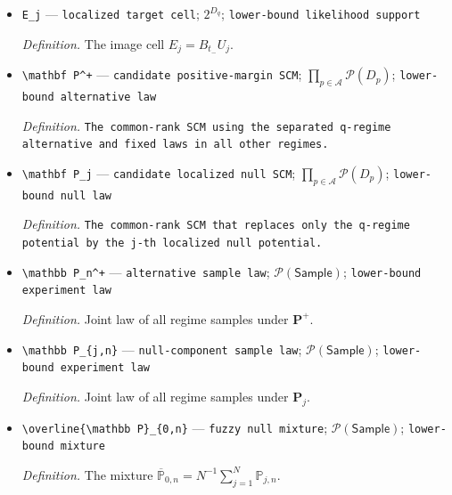 \documentclass{article}
\begin{document}
\begin{itemize}
  \par\smallskip\noindent\emph{Definition.} The density difference \(e_j=f_q^{(j)}-f_q^+\).
  \item \texttt{E\_\allowbreak{}j} --- \texttt{localized target cell}; \(2^{D_q}\); \texttt{lower-\allowbreak{}bound likelihood support}
  \par\smallskip\noindent\emph{Definition.} The image cell \(E_j=B_{t_{-}}U_j\).
  \item \texttt{\textbackslash{}\allowbreak{}mathbf P\textasciicircum{}+\allowbreak{}} --- \texttt{candidate positive-\allowbreak{}margin SCM}; \(\prod_{p\in\mathcal A}\mathcal P(D_p)\); \texttt{lower-\allowbreak{}bound alternative law}
  \par\smallskip\noindent\emph{Definition.} \texttt{The common-\allowbreak{}rank SCM using the separated q-\allowbreak{}regime alternative and fixed laws in all other regimes.}
  \item \texttt{\textbackslash{}\allowbreak{}mathbf P\_\allowbreak{}j} --- \texttt{candidate localized null SCM}; \(\prod_{p\in\mathcal A}\mathcal P(D_p)\); \texttt{lower-\allowbreak{}bound null law}
  \par\smallskip\noindent\emph{Definition.} \texttt{The common-\allowbreak{}rank SCM that replaces only the q-\allowbreak{}regime potential by the j-\allowbreak{}th localized null potential.}
  \item \texttt{\textbackslash{}\allowbreak{}mathbb P\_\allowbreak{}n\textasciicircum{}+\allowbreak{}} --- \texttt{alternative sample law}; \(\mathcal P(\mathsf{Sample})\); \texttt{lower-\allowbreak{}bound experiment law}
  \par\smallskip\noindent\emph{Definition.} Joint law of all regime samples under \(\mathbf P^+\).
  \item \texttt{\textbackslash{}\allowbreak{}mathbb P\_\allowbreak{}\{j,\allowbreak{}n\}\allowbreak{}} --- \texttt{null-\allowbreak{}component sample law}; \(\mathcal P(\mathsf{Sample})\); \texttt{lower-\allowbreak{}bound experiment law}
  \par\smallskip\noindent\emph{Definition.} Joint law of all regime samples under \(\mathbf P_j\).
  \item \texttt{\textbackslash{}\allowbreak{}overline\{\textbackslash{}\allowbreak{}mathbb P\}\allowbreak{}\_\allowbreak{}\{0,\allowbreak{}n\}\allowbreak{}} --- \texttt{fuzzy null mixture}; \(\mathcal P(\mathsf{Sample})\); \texttt{lower-\allowbreak{}bound mixture}
  \par\smallskip\noindent\emph{Definition.} The mixture \(\overline{\mathbb P}_{0,n}=N^{-1}\sum_{j=1}^N\mathbb P_{j,n}\).

\end{itemize}
\end{document}
